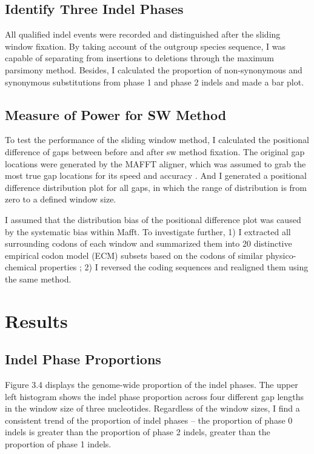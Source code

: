 \subsection{Identify Three Indel Phases}
All qualified indel events were recorded and distinguished after the sliding window fixation. By taking account of the outgroup species sequence, I was capable of separating from insertions to deletions through the maximum parsimony method. Besides, I calculated the proportion of non-synonymous and synonymous substitutions from phase 1 and phase 2 indels and made a bar plot.  

\subsection{Measure of Power for SW Method}
To test the performance of the sliding window method, I calculated the positional difference of gaps between before and after sw method fixation. The original gap locations were generated by the MAFFT aligner, which was assumed to grab the most true gap locations for its speed and accuracy \parencite{katoh2005mafft}. And I generated a positional difference distribution plot for all gaps, in which the range of distribution is from zero to a defined window size.

I assumed that the distribution bias of the positional difference plot was caused by the systematic bias within Mafft. To investigate further, 1) I extracted all surrounding codons of each window and summarized them into 20 distinctive empirical codon model (ECM) subsets based on the codons of similar physico-chemical properties \parencite{kosiol2007empirical}; 2) I reversed the coding sequences and realigned them using the same method.   

\section{Results}
\subsection{Indel Phase Proportions}
Figure 3.4 displays the genome-wide proportion of the indel phases. The upper left histogram shows the indel phase proportion across four different gap lengths in the window size of three nucleotides. Regardless of the window sizes, I find a consistent trend of the proportion of indel phases -- the proportion of phase 0 indels is greater than the proportion of phase 2 indels, greater than the proportion of phase 1 indels.  

